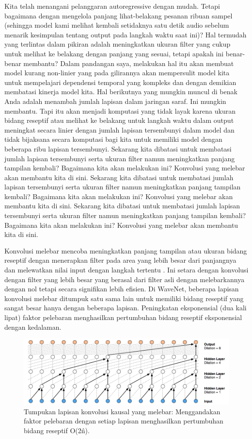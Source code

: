 Kita telah menangani pelanggaran autoregressive dengan mudah. Tetapi bagaimana dengan mengelola panjang lihat-belakang pesanan ribuan sampel (sehingga model kami melihat kembali setidaknya satu detik audio sebelum menarik kesimpulan tentang output pada langkah waktu saat ini)? Hal termudah yang terlintas dalam pikiran adalah meningkatkan ukuran filter yang cukup untuk melihat ke belakang dengan panjang yang sesuai, tetapi apakah ini benar-benar membantu? Dalam pandangan saya, melakukan hal itu akan membuat model kurang non-linier yang pada gilirannya akan mempersulit model kita untuk mempelajari dependensi temporal yang kompleks dan dengan demikian membatasi kinerja model kita. Hal berikutnya yang mungkin muncul di benak Anda adalah menambah jumlah lapisan dalam jaringan saraf. Ini mungkin membantu. Tapi itu akan menjadi komputasi yang tidak layak karena ukuran bidang reseptif atau melihat ke belakang untuk langkah waktu dalam output meningkat secara linier dengan jumlah lapisan tersembunyi dalam model dan tidak bijaksana secara komputasi bagi kita untuk memiliki model dengan beberapa ribu lapisan tersembunyi. Sekarang kita dibatasi untuk membatasi jumlah lapisan tersembunyi serta ukuran filter namun meningkatkan panjang tampilan kembali? Bagaimana kita akan melakukan ini? Konvolusi yang melebar akan membantu kita di sini. Sekarang kita dibatasi untuk membatasi jumlah lapisan tersembunyi serta ukuran filter namun meningkatkan panjang tampilan kembali? Bagaimana kita akan melakukan ini? Konvolusi yang melebar akan membantu kita di sini. Sekarang kita dibatasi untuk membatasi jumlah lapisan tersembunyi serta ukuran filter namun meningkatkan panjang tampilan kembali? Bagaimana kita akan melakukan ini? Konvolusi yang melebar akan membantu kita di sini.

Konvolusi melebar mencoba meningkatkan panjang tampilan atau ukuran bidang reseptif dengan menerapkan filter pada area yang lebih besar dari panjangnya dan melewatkan nilai input dengan langkah tertentu . Ini setara dengan konvolusi dengan filter yang lebih besar yang berasal dari filter asli dengan melebarkannya dengan nol tetapi secara signifikan lebih efisien. Di WaveNet, beberapa lapisan konvolusi melebar ditumpuk satu sama lain untuk memiliki bidang reseptif yang sangat besar hanya dengan beberapa lapisan. Peningkatan eksponensial (dua kali lipat) faktor pelebaran menghasilkan pertumbuhan bidang reseptif eksponensial dengan kedalaman.

\begin{figure}[H]
        \centerline{\includegraphics[scale=.35]{figures/cnn1}}
        \caption{Tumpukan lapisan konvolusi kausal yang melebar: Menggandakan faktor pelebaran dengan setiap lapisan menghasilkan pertumbuhan bidang reseptif O(2\^n).}
		\label{cnn1}
\end{figure}

